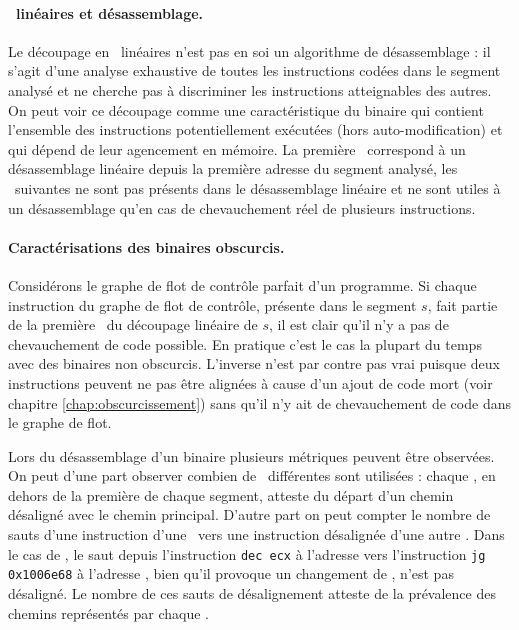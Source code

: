 \paragraph{\Layers\ linéaires et désassemblage.}
Le découpage en \layers\ linéaires n'est pas en soi un algorithme de désassemblage : il s'agit d'une analyse exhaustive de toutes les instructions codées dans le segment analysé et ne cherche pas à discriminer les instructions atteignables des autres.
On peut voir ce découpage comme une caractéristique du binaire qui contient l'ensemble des instructions potentiellement exécutées (hors auto-modification) et qui dépend de leur agencement en mémoire.
La première \layer\ correspond à un désassemblage linéaire depuis la première adresse du segment analysé, les \layers\ suivantes ne sont pas présents dans le désassemblage linéaire et ne sont utiles à un désassemblage qu'en cas de chevauchement réel de plusieurs instructions.

\paragraph{Caractérisations des binaires obscurcis.}
Considérons le graphe de flot de contrôle parfait d'un programme.
Si chaque instruction du graphe de flot de contrôle, présente dans le segment $s$, fait partie de la première \layer\ du découpage linéaire de $s$, il est clair qu'il n'y a pas de chevauchement de code possible.
En pratique c'est le cas la plupart du temps avec des binaires non obscurcis.
L'inverse n'est par contre pas vrai puisque deux instructions peuvent ne pas être alignées à cause d'un ajout de code mort (voir chapitre \ref{chap:obscurcissement}) sans qu'il n'y ait de chevauchement de code dans le graphe de flot.

Lors du désassemblage d'un binaire plusieurs métriques peuvent être observées.
On peut d'une part observer combien de \layers\ différentes sont utilisées : chaque \layer, en dehors de la première de chaque segment, atteste du départ d'un chemin désaligné avec le chemin principal.
D'autre part on peut compter le nombre de sauts d'une instruction d'une \layer\ vers une instruction désalignée d'une autre \layer. Dans le cas de \telock, le saut depuis l'instruction \texttt{dec ecx} à l'adresse  vers l'instruction \texttt{jg 0x1006e68} à l'adresse , bien qu'il provoque un changement de \layer, n'est pas désaligné. Le nombre de ces sauts de désalignement atteste de la prévalence des chemins représentés par chaque \layer.

